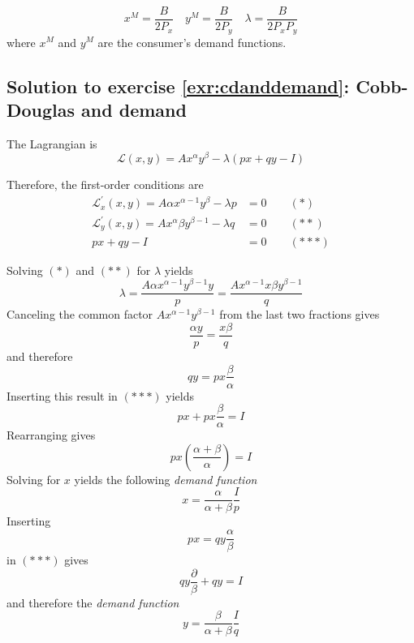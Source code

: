 \documentclass[
  12pt,
  oneside]{book}
\theoremstyle{definition}
\theoremstyle{definition}
\theoremstyle{definition}
\theoremstyle{definition}
\theoremstyle{remark}
\begin{document}
\[
  x^{M}=\frac{B}{2 P_{x}} \quad y^{M}=\frac{B}{2 P_{y}} \quad \lambda=\frac{B}{2 P_{x} P_{y}}
\]
where \(x^{M}\) and \(y^{M}\) are the consumer's demand functions.

\hypertarget{sol:cdanddemand}{%
\subsection*{Solution to exercise \ref{exr:cdanddemand}: Cobb-Douglas and demand}\label{sol:cdanddemand}}

The Lagrangian is
\[
\mathcal{L}(x, y)=A x^{\alpha} y^{\beta}-\lambda(p x+q y-I)
\]

Therefore, the first-order conditions are
\[
    \begin{aligned}
        \mathcal{L}_{x}^{\prime}(x, y)=A \alpha x^{\alpha-1} y^{\beta}-\lambda p &=0 \qquad (*)\\
        \mathcal{L}_{y}^{\prime}(x, y)=A x^{\alpha} \beta y^{\beta-1}-\lambda q &=0  \qquad (**)\\
        p x+q y-I &=0  \qquad (***)
    \end{aligned}
\]

Solving \((*)\) and \((**)\) for \(\lambda\) yields
\[
\lambda=\frac{A \alpha x^{\alpha-1} y^{\beta-1} y}{p}=\frac{A x^{\alpha-1} x \beta y^{\beta-1}}{q}
\]
Canceling the common factor \(A x^{\alpha-1} y^{\beta-1}\) from the last two fractions gives
\[
    \frac{\alpha y}{p}=\frac{x \beta}{q}
\]
and therefore
\[
q y=p x \frac{\beta}{\alpha}
\]
Inserting this result in \((***)\) yields
\[
p x+p x \frac{\beta}{\alpha}=I
\]
Rearranging gives
\[
p x\left(\frac{\alpha+\beta}{\alpha}\right)=I
\]
Solving for \(x\) yields the following \textit{demand function}
\[
x=\frac{\alpha}{\alpha+\beta} \frac{I}{p}
\]
Inserting
\[
p x=q y \frac{\alpha}{\beta}
\]
in \((***)\) gives
\[
q y \frac{\partial}{\beta}+q y=I
\]
and therefore the \textit{demand function}
\[
y=\frac{\beta}{\alpha+\beta}  \frac{I}{q}
\]

  
\end{document}
